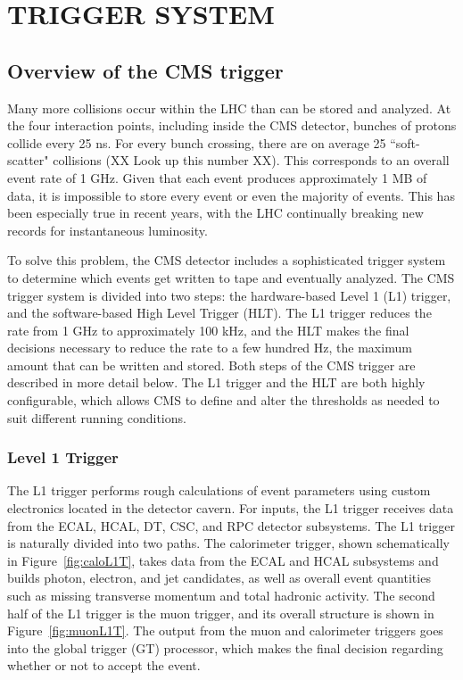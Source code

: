 \chapter{TRIGGER SYSTEM}
\label{chap:Trigger}

\section{Overview of the CMS trigger}
\label{sec:trigOverview}
Many more collisions occur within the LHC than can be stored and analyzed. At the four interaction points, including inside the CMS detector, bunches of protons collide every 25 ns. For every bunch crossing, there are on average 25 ``soft-scatter" collisions (XX Look up this number XX). This corresponds to an overall event rate of 1 GHz. Given that each event produces approximately 1 MB of data, it is impossible to store every event or even the majority of events. This has been especially true in recent years, with the LHC continually breaking new records for instantaneous luminosity. 

To solve this problem, the CMS detector includes a sophisticated trigger system to determine which events get written to tape and eventually analyzed. The CMS trigger system is divided into two steps: the hardware-based Level 1 (L1) trigger, and the software-based High Level Trigger (HLT). The L1 trigger reduces the rate from 1 GHz to approximately 100 kHz, and the HLT makes the final decisions necessary to reduce the rate to a few hundred Hz, the maximum amount that can be written and stored. Both steps of the CMS trigger are described in more detail below. The L1 trigger and the HLT are both highly configurable, which allows CMS to define and alter the thresholds as needed to suit different running conditions.

\subsection{Level 1 Trigger}
\label{sec:L1}
The L1 trigger performs rough calculations of event parameters using custom electronics located in the detector cavern. For inputs, the L1 trigger receives data from the ECAL, HCAL, DT, CSC, and RPC detector subsystems. The L1 trigger is naturally divided into two paths. The calorimeter trigger, shown schematically in Figure~\ref{fig:caloL1T}, takes data from the ECAL and HCAL subsystems and builds photon, electron, and jet candidates, as well as overall event quantities such as missing transverse momentum and total hadronic activity. The second half of the L1 trigger is the muon trigger, and its overall structure is shown in Figure~\ref{fig:muonL1T}. The output from the muon and calorimeter triggers goes into the global trigger (GT) processor, which makes the final decision regarding whether or not to accept the event. 


